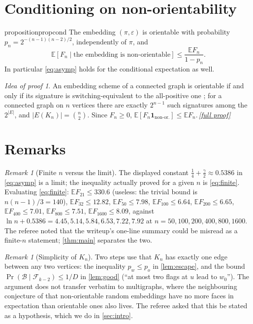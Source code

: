 \documentclass[11pt,a4paper]{article}
\theoremstyle{plain}
\theoremstyle{definition}
\theoremstyle{remark}
\newtheorem{remark}[theorem]{Remark}
\newtheorem*{proofidea}{Idea of proof}
\newcommand{\fullproofref}[1]{\,\hyperref[#1]{\textit{[full proof]}}}
\newcommand{\E}{\mathbb E}
\newcommand{\cF}{\mathcal F}
\newcommand{\Ind}{\mathbf 1}
\begin{document}
\section{Conditioning on non-orientability}\label{sec:cond}

\begin{restatable}{proposition}{propcond}\label{prop:cond}
The embedding $(\pi,\varepsilon)$ is orientable with probability $p_n=2^{-(n-1)(n-2)/2}$, independently of $\pi$, and
\[
\E[F_n\mid\text{the embedding is non-orientable}]\le\frac{\E F_n}{1-p_n}.
\]
In particular \eqref{eq:asymp} holds for the conditional expectation as well.
\end{restatable}
\begin{proofidea}
An embedding scheme of a connected graph is orientable if and only if its signature is switching-equivalent to the all-positive one \cite{MT01}; for a connected graph on $n$ vertices there are exactly $2^{n-1}$ such signatures among the $2^{|E|}$, and $|E(K_n)|=\binom n2$. Since $F_n\ge0$, $\E[F_n\Ind_{\text{non-or.}}]\le\E F_n$.\fullproofref{pf:cond}
\end{proofidea}

\section{Remarks}\label{sec:remarks}

\begin{remark}[Finite $n$ versus the limit]\label{rem:finite}
The displayed constant $\frac14+\frac\gamma2\approx0.5386$ in \eqref{eq:asymp} is a limit; the inequality actually proved for a given $n$ is \eqref{eq:finite}. Evaluating \eqref{eq:finite}: $\E F_{21}\le330.6$ (useless: the trivial bound is $n(n-1)/3=140$), $\E F_{32}\le12.82$, $\E F_{50}\le7.98$, $\E F_{100}\le6.64$, $\E F_{200}\le6.65$, $\E F_{400}\le7.01$, $\E F_{800}\le7.51$, $\E F_{1600}\le8.09$, against $\ln n+0.5386=4.45,5.14,5.84,6.53,7.22,7.92$ at $n=50,100,200,400,800,1600$. The referee noted that the writeup's one-line summary could be misread as a finite-$n$ statement; \cref{thm:main} separates the two.
\end{remark}

\begin{remark}[Simplicity of $K_n$]\label{rem:simple}
Two steps use that $K_n$ has exactly one edge between any two vertices: the inequality $p_w\le p_o$ in \cref{lem:escape}, and the bound $\Pr(\mathcal B\mid\cF_{k-2})\le1/D$ in \cref{lem:good} (``at most two flags at $u$ lead to $w_0$''). The argument does not transfer verbatim to multigraphs, where the neighbouring conjecture of \cite[Section~9]{CHMMS} that non-orientable random embeddings have no more faces in expectation than orientable ones also lives. The referee asked that this be stated as a hypothesis, which we do in \cref{sec:intro}.
\end{remark}
\end{document}
